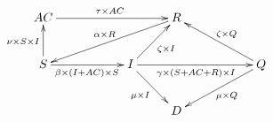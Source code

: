 \documentclass[convert]{standalone}
\begin{document}
\(
    \xymatrix{
        AC \ar[rrr]^{\tau \times AC} & & & R \ar[dlll]_{\alpha\times R} & \\
        S\ar[rr]_{\beta\times (I + AC) \times S}\ar[u]^{\nu \times S \times I} & & I \ar[ur]_{\zeta\times I}\ar[rrr]_{\gamma \times (S + AC + R) \times I} \ar[dr]_{\mu \times I} & & &
        Q\ar[ull]_{\zeta\times Q} \ar[dll]^{\mu \times Q}\\
        & &  & D &
    }
\)
\end{document}
